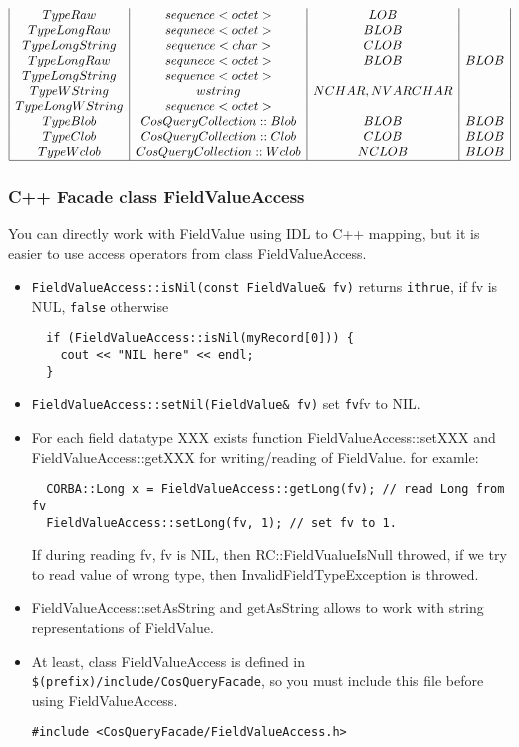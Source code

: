 \documentclass[10pt]{article}
\begin{document}
\begin{footnotesize}
$$\begin{array}{|c|c|c|c|}
     TypeRaw  &  sequence<octet>  &  LOB &\\
     TypeLongRaw & sequnece<octet> & BLOB &\\
     TypeLongString & sequence<char> &  CLOB &\\
     TypeLongRaw & sequnece<octet> & BLOB                    & BLOB \\
     TypeLongString & sequence<octet> && \\
     TypeWString & wstring  & NCHAR, NVARCHAR &\\
     TypeLongWString & sequence<octet> && \\
     TypeBlob & CosQueryCollection::Blob & BLOB & BLOB \\
     TypeClob & CosQueryCollection::Clob & CLOB & BLOB \\
     TypeWclob & CosQueryCollection::Wclob & NCLOB & BLOB \\ \hline
   \end{array}
  $$
\end{footnotesize}
   
\subsubsection{ C++ Facade class  FieldValueAccess }

   You can directly work with FieldValue using IDL to C++ mapping, but it 
   is easier to use 
   access operators from class FieldValueAccess.
  \begin{itemize}
   \item \verb|FieldValueAccess::isNil(const FieldValue& fv)| returns 
    \verb|ithrue|, 
    if fv is NUL, \verb|false| otherwise
\begin{verbatim}
  if (FieldValueAccess::isNil(myRecord[0])) {
    cout << "NIL here" << endl;
  }
\end{verbatim}
   \item \verb|FieldValueAccess::setNil(FieldValue& fv)| set \verb|fv|fv to NIL. 
   \item For each field datatype XXX exists function FieldValueAccess::setXXX 
  and
   FieldValueAccess::getXXX for writing/reading of FieldValue.
 \newline
   for examle:
\begin{verbatim}
  CORBA::Long x = FieldValueAccess::getLong(fv); // read Long from fv
  FieldValueAccess::setLong(fv, 1); // set fv to 1.
\end{verbatim}
   If during reading fv, fv is NIL, then RC::FieldVualueIsNull throwed,
   if we try to read value of wrong type, then InvalidFieldTypeException is
   throwed.
   \item FieldValueAccess::setAsString and getAsString 
         allows to work with string representations of FieldValue.
   \item At least, class FieldValueAccess is defined in \verb|$(prefix)/include/CosQueryFacade|, so you must include this file before using FieldValueAccess.
\begin{verbatim}
#include <CosQueryFacade/FieldValueAccess.h>
\end{verbatim}
  \end{itemize}
\end{document}
